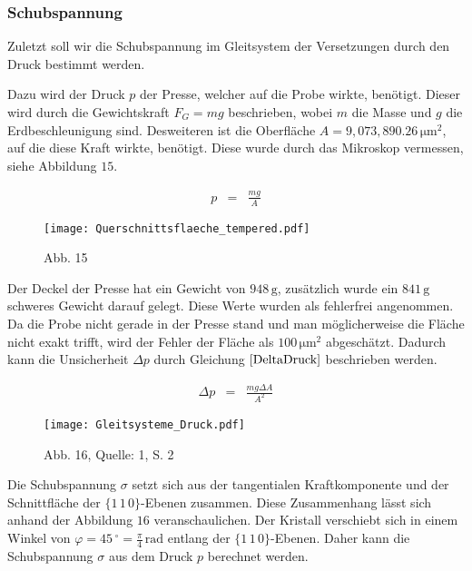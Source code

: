 \documentclass[12pt,a4paper]{scrartcl}
\numberwithin{equation}{section} %
\renewcommand{\[}{} %
\renewcommand{\]}{\noindent} %
\begin{document}
\hypertarget{schubspannung}{%
\subsubsection{Schubspannung}\label{schubspannung}}

Zuletzt soll wir die Schubspannung im Gleitsystem der Versetzungen durch
den Druck bestimmt werden.

Dazu wird der Druck \(p\) der Presse, welcher auf die Probe wirkte,
benötigt. Dieser wird durch die Gewichtskraft \(F_G=mg\) beschrieben,
wobei \(m\) die Masse und \(g\) die Erdbeschleunigung sind. Desweiteren
ist die Oberfläche \(A=9,073,890.26\mathrm{\,\mu m^2}\), auf die diese
Kraft wirkte, benötigt. Diese wurde durch das Mikroskop vermessen, siehe
Abbildung \(15\).

\[
\begin{eqnarray}
    p &=& \frac{mg}{A} \label{Druck}
\end{eqnarray}
\]

\begin{figure}
\centering
\texttt{[image: Querschnittsflaeche\_tempered.pdf]}
\caption{Abb. 15}
\end{figure}

Der Deckel der Presse hat ein Gewicht von \(948\mathrm{\,g}\),
zusätzlich wurde ein \(841\mathrm{\,g}\) schweres Gewicht darauf gelegt.
Diese Werte wurden als fehlerfrei angenommen. Da die Probe nicht gerade
in der Presse stand und man möglicherweise die Fläche nicht exakt
trifft, wird der Fehler der Fläche als \(100\mathrm{\,\mu m^2}\)
abgeschätzt. Dadurch kann die Unsicherheit \(\Delta p\) durch Gleichung
\(\eqref{DeltaDruck}\) beschrieben werden.

\[
\begin{eqnarray}
    \Delta p &=& \frac{mg \Delta A}{A^2} \label{DeltaDruck}
\end{eqnarray}
\]

\begin{figure}
\centering
\texttt{[image: Gleitsysteme\_Druck.pdf]}
\caption{Abb. 16, Quelle: 1, S. 2}
\end{figure}

Die Schubspannung \(\sigma\) setzt sich aus der tangentialen
Kraftkomponente und der Schnittfläche der
\(\lbrace1\,1\,0\rbrace\)-Ebenen zusammen. Diese Zusammenhang lässt sich
anhand der Abbildung \(16\) veranschaulichen. Der Kristall verschiebt
sich in einem Winkel von
\(\varphi=45\,^\circ=\frac{\pi}{4}\mathrm{\,rad}\) entlang der
\(\lbrace1\,1\,0\rbrace\)-Ebenen. Daher kann die Schubspannung
\(\sigma\) aus dem Druck \(p\) berechnet werden.
\end{document}

